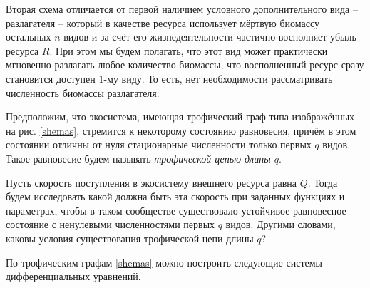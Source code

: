     Вторая схема отличается от первой наличием условного дополнительного вида -- разлагателя -- который в качестве ресурса использует мёртвую биомассу остальных \(n\) видов и за счёт его жизнедеятельности частично восполняет убыль ресурса \(R\). При этом мы будем полагать, что этот вид может практически мгновенно разлагать любое количество биомассы, что восполненный ресурс сразу становится доступен \(1\)-му виду. То есть, нет необходимости рассматривать численность биомассы разлагателя.

    Предположим, что экосистема, имеющая трофический граф типа изображённых на рис. \ref{shemas}, стремится к некоторому состоянию равновесия, причём в этом состоянии отличны от нуля стационарные численности только первых \(q\) видов. Такое равновесие будем называть \textit{трофической цепью длины \(q\)}. 

    Пусть скорость поступления в экосистему внешнего ресурса равна \(Q\). Тогда будем исследовать какой должна быть эта скорость при заданных функциях и параметрах, чтобы в таком сообществе существовало устойчивое равновесное состояние с ненулевыми численностями первых \(q\) видов. Другими словами, каковы условия существования трофической цепи длины \(q\)?

    По трофическим графам \ref{shemas} можно построить следующие системы дифференциальных уравнений. 


